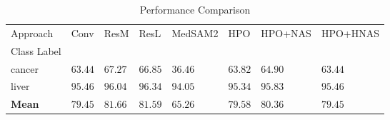 \begin{table}
\caption{Performance Comparison}
\label{tab:results}
\begin{tabular}{llllllll}
\toprule
Approach & Conv & ResM & ResL & MedSAM2 & HPO & HPO+NAS & HPO+HNAS \\
Class Label &  &  &  &  &  &  &  \\
\midrule
cancer & $63.44$ & $\mathbf{67.27}$ & $66.85$ & $36.46$ & $63.82$ & $64.90$ & $63.44$ \\
liver & $95.46$ & $96.04$ & $\mathbf{96.34}$ & $94.05$ & $95.34$ & $95.83$ & $95.46$ \\
\textbf{Mean} & $79.45$ & $\mathbf{81.66}$ & $81.59$ & $65.26$ & $79.58$ & $80.36$ & $79.45$ \\
\bottomrule
\end{tabular}
\end{table}
